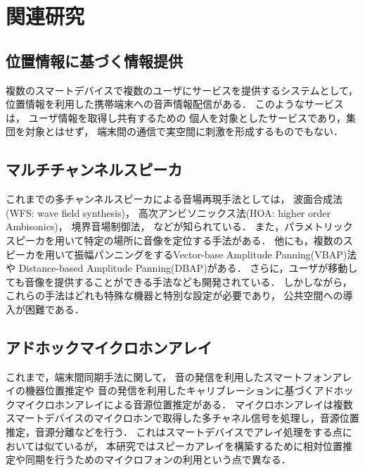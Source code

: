 \chapter{関連研究}

\section{位置情報に基づく情報提供}

複数のスマートデバイスで複数のユーザにサービスを提供するシステムとして，
位置情報を利用した携帯端末への音声情報配信\cite{kawagoe14}がある．
このようなサービスは，
ユーザ情報を取得し共有するための
個人を対象としたサービスであり，集団を対象とはせず，
端末間の通信で実空間に刺激を形成するものでもない．


\section{マルチチャンネルスピーカ}

これまでの多チャンネルスピーカによる音場再現手法としては，
波面合成法(WFS: wave field synthesis)\cite{wfs, 木村敏幸}，
高次アンビソニックス法(HOA: higher order Ambisonics)\cite{hoa, 小山翔一}，
境界音場制御法\cite{sfc, 伊勢史郎, 岡田耕介}，
などが知られている\cite{鈴木陽一, 濱崎公男, 尾本章}．
また，パラメトリックスピーカを用いて特定の場所に音像を定位する手法\cite{paramsp}がある．
他にも，複数のスピーカを用いて振幅パンニングをするVector-base Amplitude Panning(VBAP)法\cite{PULKKI}や
Distance-based Amplitude Panning(DBAP)\cite{dbap}がある．
さらに，ユーザが移動しても音像を提供することができる手法\cite{湯山雄太}なども開発されている．
しかしながら，これらの手法はどれも特殊な機器と特別な設定が必要であり，
公共空間への導入が困難である．


\section{アドホックマイクロホンアレイ}

これまで，端末間同期手法に関して，
音の発信を利用したスマートフォンアレイの機器位置推定\cite{shibata13}や
音の発信を利用したキャリブレーションに基づくアドホックマイクロホンアレイによる音源位置推定\cite{shibata14}がある．
マイクロホンアレイは複数スマートデバイスのマイクロホンで取得した多チャネル信号を処理し，音源位置推定，音源分離などを行う\cite{小野順貴14-1, 小野順貴14-2}．
これはスマートデバイスでアレイ処理をする点においては似ているが，
本研究ではスピーカアレイを構築するために相対位置推定や同期を行うためのマイクロフォンの利用という点で異なる．


